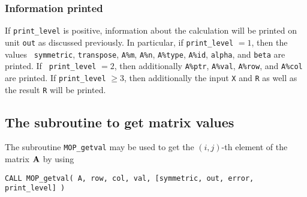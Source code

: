 \documentclass{galahad}
\newcommand{\packagename}{MOP}
\begin{document}
\subsubsection{Information printed}\label{Ax-info}

If {\tt print\_level} is positive, information about the calculation
will be printed on unit {\tt out} as discussed previously.  In
particular, if {\tt print\_level} $= 1$, then the values {\tt
  symmetric}, {\tt transpose}, {\tt A\%m}, {\tt A\%n}, {\tt A\%type},
{\tt A\%id}, {\tt alpha}, and {\tt beta} are printed.  If {\tt
  print\_level} $= 2$, then additionally {\tt A\%ptr}, {\tt A\%val},
{\tt A\%row}, and {\tt A\%col} are printed.  If {\tt print\_level}
$\geq 3$, then additionally the input {\tt X} and {\tt R} as well as
the result {\tt R} will be printed.


\subsection{The subroutine to get matrix values}\label{getval}

The subroutine {\tt \packagename\_getval} may be used to get the
$(i,j)$-th element of the matrix ${\mathbf{A}}$ by using
\vspace*{1mm}

\hspace{8mm}
{\tt CALL \packagename\_getval( A, row, col, val, [symmetric, out,
                                error, print\_level] )}
\end{document}
